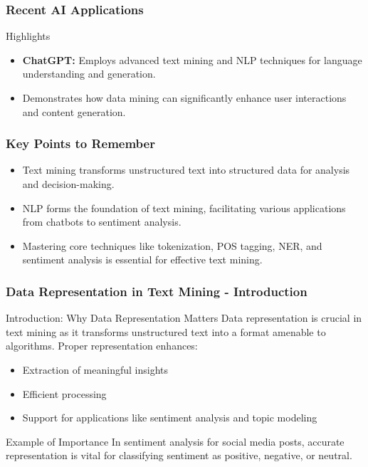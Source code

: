 \documentclass[aspectratio=169]{beamer}
\begin{document}
\begin{frame}[fragile]
    \frametitle{Recent AI Applications}
    \begin{block}{Highlights}
        \begin{itemize}
            \item \textbf{ChatGPT:} Employs advanced text mining and NLP techniques for language understanding and generation. 
            \item Demonstrates how data mining can significantly enhance user interactions and content generation.
        \end{itemize}
    \end{block}
\end{frame}

\begin{frame}[fragile]
    \frametitle{Key Points to Remember}
    \begin{itemize}
        \item Text mining transforms unstructured text into structured data for analysis and decision-making.
        \item NLP forms the foundation of text mining, facilitating various applications from chatbots to sentiment analysis.
        \item Mastering core techniques like tokenization, POS tagging, NER, and sentiment analysis is essential for effective text mining.
    \end{itemize}
\end{frame}

\begin{frame}[fragile]
    \frametitle{Data Representation in Text Mining - Introduction}
    \begin{block}{Introduction: Why Data Representation Matters}
        Data representation is crucial in text mining as it transforms unstructured text into a format amenable to algorithms. Proper representation enhances:
        \begin{itemize}
            \item Extraction of meaningful insights
            \item Efficient processing
            \item Support for applications like sentiment analysis and topic modeling
        \end{itemize}
        \begin{exampleblock}{Example of Importance}
            In sentiment analysis for social media posts, accurate representation is vital for classifying sentiment as positive, negative, or neutral.
        \end{exampleblock}
    \end{block}
\end{frame}
\end{document}
